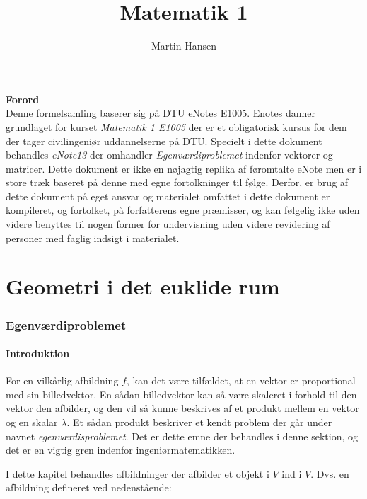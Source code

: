 \documentclass{article}
\author{Martin Hansen}
\title{Matematik 1}
\begin{document}
	
	\maketitle
	\pagebreak
	\begin{center}
		\Large \textbf{Forord} \\
		Denne formelsamling baserer sig på DTU eNotes E1005. Enotes danner grundlaget for kurset \textit{Matematik 1 E1005} der er et obligatorisk kursus for dem der tager civilingeniør uddannelserne på DTU. Specielt i dette dokument behandles \textit{eNote13} der omhandler \textit{Egenværdiproblemet} indenfor vektorer og matricer. Dette dokument er ikke en nøjagtig replika af føromtalte eNote men er i store træk baseret på denne med egne fortolkninger til følge. Derfor, er brug af dette dokument på eget ansvar og materialet omfattet i dette dokument er kompileret, og fortolket, på forfatterens egne præmisser, og kan følgelig ikke uden videre benyttes til nogen former for undervisning uden videre revidering af personer med faglig indsigt i materialet. 
	\end{center}
	\pagebreak
	\tableofcontents
	\pagebreak
	\part{\textbf{Geometri i det euklide rum}}
	
	\section{Egenværdiproblemet}
	
	\subsection*{Introduktion}
	
	For en vilkårlig afbildning $f$, kan det være tilfældet, at en vektor er proportional med sin billedvektor. En sådan billedvektor kan så være skaleret i forhold til den vektor den afbilder, og den vil så kunne beskrives af et produkt mellem en vektor og en skalar $\lambda$. Et sådan produkt beskriver et kendt problem der går under navnet \textit{egenværdisproblemet}. Det er dette emne der behandles i denne sektion, og det er en vigtig gren indenfor ingeniørmatematikken. \newline
	
	I dette kapitel behandles afbildninger der afbilder et objekt i $V$ ind i $V$. Dvs. en afbildning defineret ved nedenstående:
	
\end{document}
